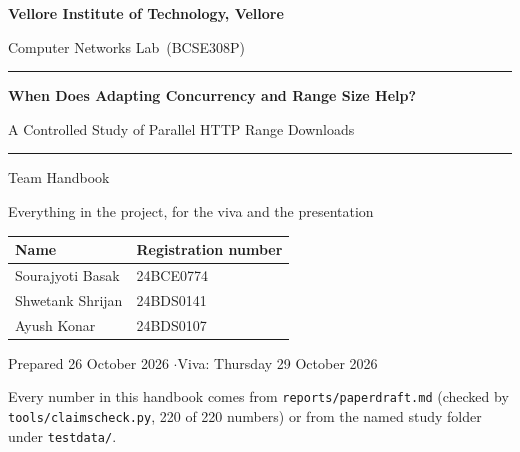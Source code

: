 \documentclass[11pt,a4paper]{report}
\newcommand{\Institute}{Vellore Institute of Technology, Vellore}
\newcommand{\CourseName}{Computer Networks Lab}
\newcommand{\CourseCode}{BCSE308P}
\newcommand{\MemberA}{Sourajyoti Basak} \newcommand{\RegA}{24BCE0774}
\newcommand{\MemberB}{Shwetank Shrijan} \newcommand{\RegB}{24BDS0141}
\newcommand{\MemberC}{Ayush Konar} \newcommand{\RegC}{24BDS0107}
\renewcommand{\_}{\oldus\allowbreak}
\newcommand{\code}[1]{\texttt{#1}}
\begin{document}
\begin{titlepage}
\centering\sffamily
\vspace*{0.3cm}
{\Large\bfseries \Institute\par}
\vspace{0.3cm}
{\large \CourseName\ (\CourseCode)\par}
\vspace{2.0cm}
\rule{\linewidth}{0.8pt}\par\vspace{0.4cm}
{\huge\bfseries When Does Adapting Concurrency and Range Size Help?\par}
\vspace{0.3cm}
{\Large A Controlled Study of Parallel HTTP Range Downloads\par}
\vspace{0.4cm}\rule{\linewidth}{0.8pt}\par
\vspace{1.0cm}
{\LARGE Team Handbook\par}
\vspace{0.3cm}
{\large Everything in the project, for the viva and the presentation\par}
\vspace{2.0cm}
\begin{tabular}{ll}
\toprule
\textbf{Name} & \textbf{Registration number}\\
\midrule
\MemberA & \RegA\\
\MemberB & \RegB\\
\MemberC & \RegC\\
\bottomrule
\end{tabular}
\vfill
{\large Prepared 26 October 2026 \quad$\cdot$\quad Viva: Thursday 29 October 2026\par}
\vspace{0.3cm}
{\small Every number in this handbook comes from \code{reports/paper\_draft.md} (checked by \code{tools/claims\_check.py}, 220 of 220 numbers) or from the named study folder under \code{testdata/}.\par}
\end{titlepage}

\tableofcontents
\clearpage
\listoffigures
\listoftables
\clearpage
{}
















\appendix





\end{document}
